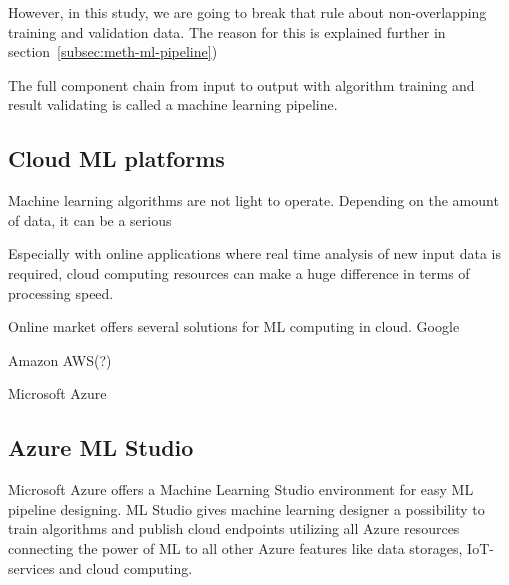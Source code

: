 However, in this study,
we are going to break that rule
about non-overlapping training and validation data.
The reason for this is explained further in section~\ref{subsec:meth-ml-pipeline})







The full component chain from input to output
with algorithm training and result validating
is called a machine learning pipeline.


\subsection{Cloud ML platforms}\label{subsec:bg-cloud-ml-platforms}

Machine learning algorithms are not light to operate.
Depending on the amount of data,
it can be a serious %

Especially with online applications
where real time analysis of new input data is required,
cloud computing resources can make a huge difference
in terms of processing speed. %

Online market offers several solutions for ML computing in cloud.
Google

Amazon AWS(?)

Microsoft Azure\cite{altexsoft}


\subsection{Azure ML Studio}\label{subsec:bg-azure-ml-studio-algorithms}

Microsoft Azure offers a Machine Learning Studio environment
for easy ML pipeline designing.
ML Studio gives machine learning designer a possibility to
train algorithms and publish cloud endpoints
utilizing all Azure resources
connecting the power of ML
to all other Azure features
like data storages, IoT-services and cloud computing.

